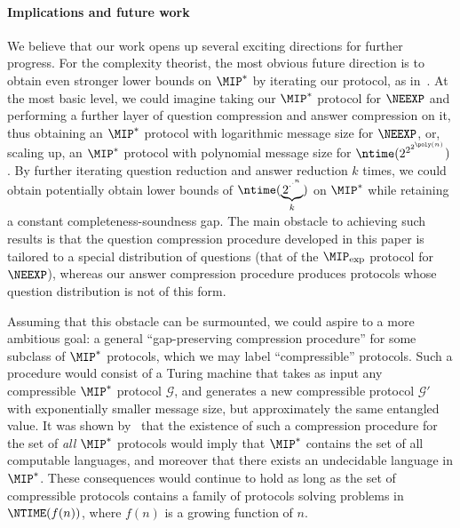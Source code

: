 \documentclass[11pt]{article}
\newcommand{\game}{\mathscr{G}}
\begin{document}
\paragraph{Implications and future work}
We believe that our work opens up several exciting directions for
further progress. For the complexity theorist, the most obvious future
direction is to obtain even stronger lower bounds on $\MIP^*$ by
iterating our protocol, as in~\cite{FJVY19}. At the most basic level,
we could imagine taking our $\MIP^*$ protocol for $\NEEXP$ and
performing a further layer of question compression and answer compression
on it, thus obtaining an $\MIP^*$ protocol with
logarithmic message size for $\NEEXP$, or, scaling up, an $\MIP^*$
protocol with polynomial message size for
$\ntime(2^{2^{2^{\poly(n)}}})$. By further iterating question
reduction and answer reduction $k$ times, we could obtain potentially
obtain lower bounds of
$\ntime(\underbrace{2^{\cdot^{\cdot^{n}}}}_{k})$ on $\MIP^*$ while
retaining a constant completeness-soundness gap. The main obstacle to
achieving such results is that the question compression procedure
developed in this paper is tailored to a special distribution of
questions (that of the $\MIP_{\exp}$ protocol for $\NEEXP$), whereas our
answer compression procedure produces protocols whose question
distribution is not of this form.

Assuming that this obstacle can be surmounted, we could aspire to a
more ambitious goal: a general ``gap-preserving compression procedure'' for some
subclass of $\MIP^*$ protocols, which we may label ``compressible'' protocols. Such a procedure would consist of a
Turing  machine that takes as input any compressible $\MIP^*$
protocol $\game$, and generates a new compressible protocol $\game'$ with exponentially
smaller message size, but approximately the same entangled value. It
was shown by~\cite{FJVY19} that the existence of such a compression
procedure for the set of \emph{all} $\MIP^*$ protocols would imply
that $\MIP^*$ contains the set of all computable languages,
and moreover that there exists an undecidable language in
$\MIP^*$. These consequences would continue to hold as long as the set
of compressible protocols contains a family of protocols solving
problems in $\NTIME(f(n))$, where $f(n)$ is a growing function of
$n$.
\end{document}
